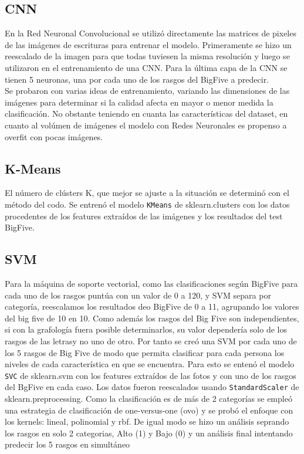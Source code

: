 \documentclass[10pt, a4paper]{article}
\begin{document}
        \subsection{CNN}
            En la Red Neuronal Convolucional se utiliz\'o directamente las matrices de pixeles de las im\'agenes de escrituras para entrenar el modelo. 
            Primeramente se hizo un reescalado de la imagen para que todas tuviesen la misma resoluci\'on y luego se utilizaron en el entrenamiento de una CNN.
            Para la \'ultima capa de la CNN se tienen 5 neuronas, una por cada uno de los rasgos del BigFive a predecir.\\
            
            Se probaron con varias ideas de entrenamiento, variando las dimensiones de las im\'agenes para determinar si la calidad afecta en mayor o menor medida 
            la clasificaci\'on. No obstante teniendo en cuanta las caracter\'isticas del dataset, en cuanto al vol\'umen de im\'agenes el modelo con Redes Neuronales es propenso 
            a overfit con pocas im\'agenes. 

        \subsection{K-Means}
            El n\'umero de cl\'usters K, que mejor se ajuste a la situaci\'on se determin\'o con el m\'etodo del codo. Se entren\'o el 
            modelo \texttt{KMeans} de sklearn.clusters con los datos procedentes de los features extra\'idos de las im\'agenes y los resultados del 
            test BigFive.
        
        \subsection{SVM}
            Para la m\'aquina de soporte vectorial, como las clasificaciones seg\'un BigFive para cada uno de los rasgos punt\'ua con un valor de 0 a 120, y SVM separa por categor\'ia,
            reescalamos los resultados deo BigFive de 0 a 11, agrupando los valores del big five de 10 en 10. Como adem\'as los rasgos del Big Five son independientes, si con la grafolog\'ia fuera posible determinarlos, su valor depender\'ia solo de los rasgos de las letrasy no uno de otro.
            Por tanto se cre\'o una SVM por cada uno de los 5 rasgos de Big Five de modo que permita clasificar para cada persona los niveles de cada caracter\'istica en que se encuentra. Para esto se enten\'o el modelo \texttt{SVC} de sklearn.svm con los features extra\'idos de las fotos y con uno de los rasgos del BgFive en cada caso.
            Los datos fueron reescalados usando \texttt{StandardScaler} de sklearn.preprocessing.
            Como la clasificaci\'on es de m\'as de 2 categor\'ias se emple\'o una estrategia de clasificaci\'on de one-versus-one (ovo) y se prob\'o el enfoque con los kernels: lineal, polinomial y rbf. De igual modo se hizo un an\'alisis seprando los rasgos en solo 2 categorias, Alto (1) y Bajo (0) y un an\'alisis final intentando predecir 
            los 5 rasgos en simult\'aneo
\end{document}
